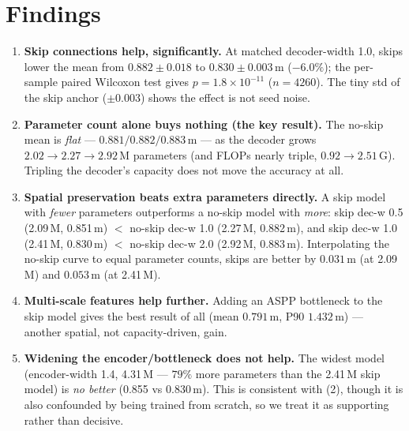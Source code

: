\documentclass[11pt]{article}
\begin{document}
\section{Findings}
\begin{enumerate}[leftmargin=1.5em,itemsep=4pt]
\item \textbf{Skip connections help, significantly.} At matched decoder-width 1.0, skips lower
      the mean from $0.882\pm0.018$ to $0.830\pm0.003$\,m ($-6.0\%$); the per-sample paired
      Wilcoxon test gives $p=1.8\times10^{-11}$ ($n=4260$). The tiny std of the skip anchor
      ($\pm0.003$) shows the effect is not seed noise.

\item \textbf{Parameter count alone buys nothing (the key result).} The no-skip mean is
      \emph{flat} --- $0.881/0.882/0.883$\,m --- as the decoder grows $2.02\!\to\!2.27\!\to\!2.92$\,M
      parameters (and FLOPs nearly triple, $0.92\!\to\!2.51$\,G). Tripling the decoder's
      capacity does not move the accuracy at all.

\item \textbf{Spatial preservation beats extra parameters directly.} A skip model with
      \emph{fewer} parameters outperforms a no-skip model with \emph{more}: skip dec-w 0.5
      (2.09\,M, 0.851\,m) $<$ no-skip dec-w 1.0 (2.27\,M, 0.882\,m), and skip dec-w 1.0
      (2.41\,M, 0.830\,m) $<$ no-skip dec-w 2.0 (2.92\,M, 0.883\,m). Interpolating the no-skip
      curve to equal parameter counts, skips are better by $0.031$\,m (at 2.09\,M) and
      $0.053$\,m (at 2.41\,M).

\item \textbf{Multi-scale features help further.} Adding an ASPP bottleneck to the skip model
      gives the best result of all (mean $0.791$\,m, P90 $1.432$\,m) --- another spatial, not
      capacity-driven, gain.

\item \textbf{Widening the encoder/bottleneck does not help.} The widest model (encoder-width
      1.4, 4.31\,M --- $79\%$ more parameters than the 2.41\,M skip model) is \emph{no better}
      (0.855 vs 0.830\,m). This is consistent with (2), though it is also confounded by being
      trained from scratch, so we treat it as supporting rather than decisive.
\end{enumerate}

\end{document}
